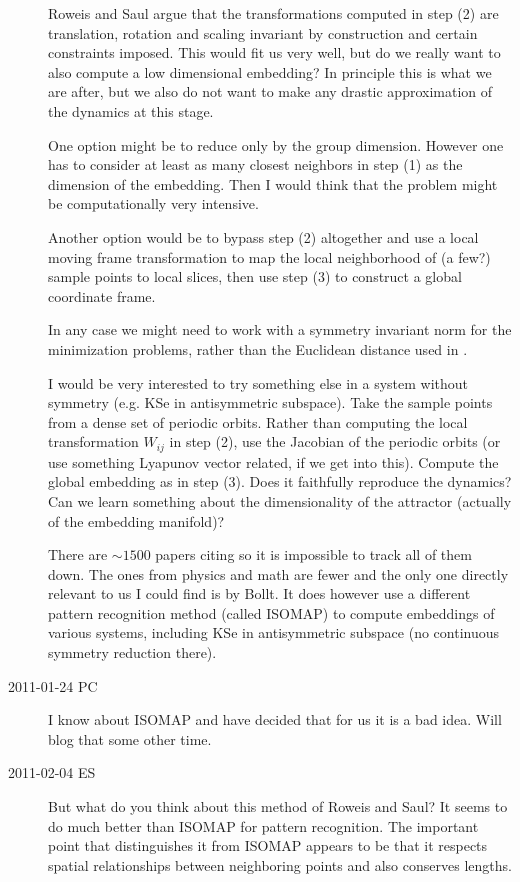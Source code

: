 \begin{description}
  Roweis and Saul argue that the transformations computed in step (2) are
  translation, rotation and scaling invariant by construction and certain
  constraints imposed. This would fit us very well, but do we really want
  to also compute a low dimensional embedding? In principle this is what we are
  after, but we also do not want to make any drastic approximation of the
  dynamics at this stage.

  One option might be to reduce only by the group dimension.
  However one has to consider at least as many closest neighbors
  in step (1) as the dimension of the embedding. Then I would think that
  the problem might be computationally very intensive.

  Another option would be to bypass step (2) altogether and use a local
  moving frame transformation to map the local neighborhood of (a few?)
  sample points to local slices, then use step (3) to construct a global
  coordinate frame.

  In any case we might need to work with a symmetry invariant norm for the
  minimization problems, rather than the Euclidean distance used in .

  I would be very interested to try something else in a system without symmetry
  (e.g. KSe in antisymmetric subspace). Take the sample points from a dense
  set of periodic orbits. Rather than computing the  local transformation
  $W_{ij}$ in step (2), use the Jacobian of the periodic orbits
  (or use something Lyapunov vector related, if we get into this).
  Compute the global embedding as in step (3). Does it faithfully reproduce
  the dynamics? Can we learn something about the dimensionality of
  the attractor (actually of the embedding manifold)?

  There are $\sim1500$ papers citing  so it is impossible to track
  all of them down. The ones from physics and math are fewer and the only one
  directly relevant to us I could find is by Bollt.
  It does however use a different pattern recognition method (called ISOMAP)
  to compute embeddings of various systems, including KSe in antisymmetric
  subspace (no continuous symmetry reduction there).

\item[2011-01-24 PC] I know about ISOMAP and have decided that for us
it is a bad idea. Will blog that some other time.

\item[2011-02-04 ES] But what do you think about this method of Roweis and
Saul? It seems to do much better than ISOMAP for pattern recognition.
The important point that distinguishes it from ISOMAP appears to be that
it respects spatial relationships between neighboring points and
also conserves lengths.


\end{description}
